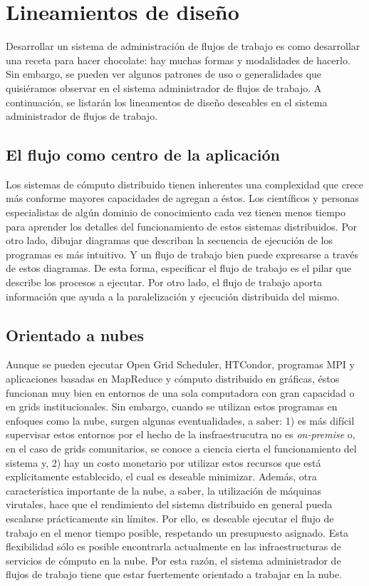 \chapter{Lineamientos de diseño}

Desarrollar un sistema de administración de flujos de trabajo es como desarrollar una receta para hacer chocolate: hay muchas formas y modalidades de hacerlo. Sin embargo, se pueden ver algunos patrones de uso o generalidades que quisiéramos observar en el sistema administrador de flujos de trabajo. A continuación, se listarán los lineamentos de diseño deseables en el sistema administrador de flujos de trabajo.



\section{El flujo como centro de la aplicación}

Los sistemas de cómputo distribuido tienen inherentes una complexidad que crece más conforme mayores capacidades de agregan a éstos. Los científicos y personas especialistas de algún dominio de conocimiento cada vez tienen menos tiempo para aprender los detalles del funcionamiento de estos sistemas distribuidos. Por otro lado, dibujar diagramas que describan la secuencia de ejecución de los programas es más intuitivo. Y un flujo de trabajo bien puede expresarse a través de estos diagramas. De esta forma, especificar el flujo de trabajo es el pilar que describe los procesos a ejecutar. Por otro lado, el flujo de trabajo aporta información que ayuda a la paralelización y ejecución distribuida del mismo.



\section{Orientado a nubes}

Aunque se pueden ejecutar Open Grid Scheduler, HTCondor, programas MPI y aplicaciones basadas en MapReduce y cómputo distribuido en gráficas, éstos funcionan muy bien en entornos de una sola computadora con gran capacidad o en grids institucionales. Sin embargo, cuando se utilizan estos programas en enfoques como la nube, surgen algunas eventualidades, a saber: 1) es más difícil supervisar estos entornos por el hecho de la insfraestrucutra no es \emph{on-premise} o, en el caso de grids comunitarios, se conoce a ciencia cierta el funcionamiento del sistema y, 2) hay un costo monetario por utilizar estos recursos que está explícitamente establecido, el cual es deseable minimizar. Además, otra característica importante de la nube, a saber, la utilización de máquinas virutales, hace que el rendimiento del sistema distribuido en general pueda escalarse prácticamente sin límites. Por ello, es deseable ejecutar el flujo de trabajo en el menor tiempo posible, respetando un presupuesto asignado. Esta flexibilidad sólo es posible encontrarla actualmente en las infraestructuras de servicios de cómputo en la nube. Por esta razón, el sistema administrador de flujos de trabajo tiene que estar fuertemente orientado a trabajar en la nube.



